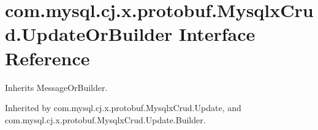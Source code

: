 \hypertarget{interfacecom_1_1mysql_1_1cj_1_1x_1_1protobuf_1_1_mysqlx_crud_1_1_update_or_builder}{}\section{com.\+mysql.\+cj.\+x.\+protobuf.\+Mysqlx\+Crud.\+Update\+Or\+Builder Interface Reference}
\label{interfacecom_1_1mysql_1_1cj_1_1x_1_1protobuf_1_1_mysqlx_crud_1_1_update_or_builder}


Inherits Message\+Or\+Builder.



Inherited by com.\+mysql.\+cj.\+x.\+protobuf.\+Mysqlx\+Crud.\+Update, and com.\+mysql.\+cj.\+x.\+protobuf.\+Mysqlx\+Crud.\+Update.\+Builder.

